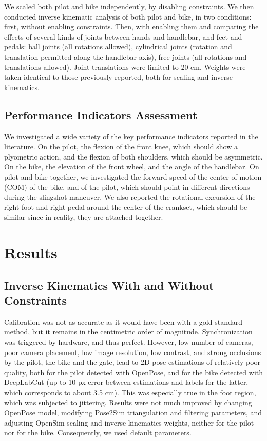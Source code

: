 We scaled both pilot and bike independently, by disabling constraints. We then conducted inverse kinematic analysis of both pilot and bike, in two conditions: first, without enabling constraints. Then, with enabling them and comparing the effects of several kinds of joints between hands and handlebar, and feet and pedals: ball joints (all rotations allowed), cylindrical joints (rotation and translation permitted along the handlebar axis), free joints (all rotations and translations allowed). Joint translations were limited to 20 cm. Weights were taken identical to those previously reported, both for scaling and inverse kinematics. 


\subsection{Performance Indicators Assessment}
We investigated a wide variety of the key performance indicators reported in the literature. On the pilot, the flexion of the front knee, which should show a plyometric action, and the flexion of both shoulders, which should be asymmetric. On the bike, the elevation of the front wheel, and the angle of the handlebar. On pilot and bike together, we investigated the forward speed of the center of motion (COM) of the bike, and of the pilot, which should point in different directions during the slingshot maneuver. We also reported the rotational excursion of the right foot and right pedal around the center of the crankset, which should be similar since in reality, they are attached together. 


\section{Results}
\subsection{Inverse Kinematics With and Without Constraints}
Calibration was not as accurate as it would have been with a gold-standard method, but it remains in the centimetric order of magnitude. Synchronization was triggered by hardware, and thus perfect. However, low number of cameras, poor camera placement, low image resolution, low contrast, and strong occlusions by the pilot, the bike and the gate, lead to 2D pose estimations of relatively poor quality, both for the pilot detected with OpenPose, and for the bike detected with DeepLabCut (up to 10 px error between estimations and labels for the latter, which corresponds to about 3.5 cm). This was especially true in the foot region, which was subjected to jittering. Results were not much improved by changing OpenPose model, modifying Pose2Sim triangulation and filtering parameters, and adjusting OpenSim scaling and inverse kinematics weights, neither for the pilot nor for the bike. Consequently, we used default parameters. 


